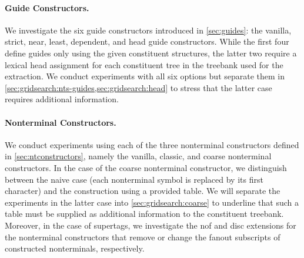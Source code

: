 \documentclass[../../document.tex]{subfiles}
\begin{document}
    \paragraph*{Guide Constructors.}
    We investigate the six guide constructors introduced in \cref{sec:guides}: the vanilla, strict, near, least, dependent, and head guide constructors.
    While the first four define guides only using the given constituent structures, the latter two require a lexical head assignment for each constituent tree in the treebank used for the extraction.
    We conduct experiments with all six options but separate them in \cref{sec:gridsearch:nts-guides,sec:gridsearch:head} to stress that the latter case requires additional information.

    \paragraph*{Nonterminal Constructors.}
    We conduct experiments using each of the three nonterminal constructors defined in \cref{sec:ntconstructors}, namely the vanilla, classic, and coarse nonterminal constructors.
    In the case of the coarse nonterminal constructor, we distinguish between the naive case (each nonterminal symbol is replaced by its first character) and the construction using a provided table.
    We will separate the experiments in the latter case into \cref{sec:gridsearch:coarse} to underline that such a table must be supplied as additional information to the constituent treebank.
    Moreover, in the case of  supertags, we investigate the nof and disc extensions for the nonterminal constructors that remove or change the fanout subscripts of constructed nonterminals, respectively.
\end{document}
